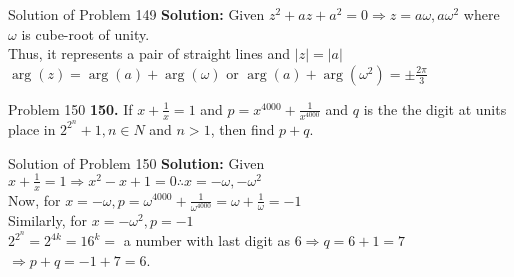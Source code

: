 \documentclass[aspectratio=169,8pt]{beamer}
\begin{document}
\begin{frame}{Solution of Problem 149}
  \textbf{Solution:} Given $z^2 + az + a^2 = 0 \Rightarrow z = a\omega, a\omega^2$ where $\omega$ is cube-root of unity.\\
  \vspace*{0.2cm}
  Thus, it represents a pair of straight lines and $|z| = |a|$\\
  \vspace*{0.2cm}
  $\arg(z) = \arg(a) + \arg(\omega)$ or $\arg(a) + \arg(\omega^2) = \pm \frac{2\pi}{3}$
\end{frame}
\begin{frame}{Problem 150}
  \textbf{150.} If $x + \frac{1}{x} = 1$ and $p = x^{4000} + \frac{1}{x^{4000}}$ and $q$ is the the digit at units place in
  $2^{2^n} + 1, n\in N$ and $n > 1$, then find $p + q$.
\end{frame}
\begin{frame}{Solution of Problem 150}
  \textbf{Solution:} Given $x + \frac{1}{x} = 1 \Rightarrow x^2 - x + 1 = 0 \therefore x = -\omega, -\omega^2$\\
  \vspace*{0.2cm}
  Now, for $x = -\omega, p = \omega^{4000} + \frac{1}{\omega^{4000}} = \omega + \frac{1}{\omega} = -1$\\
  \vspace*{0.2cm}
  Similarly, for $x = -\omega^2, p = -1$\\
  \vspace*{0.2cm}
  $2^{2^n} = 2^{4k} = 16^k =$ a number with last digit as $6 \Rightarrow q = 6 + 1 = 7$\\
  \vspace*{0.2cm}
  $\Rightarrow p + q = -1 + 7 = 6$.
\end{frame}
\end{document}
